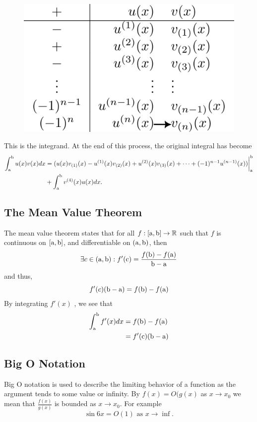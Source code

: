     \begin{figure}[H]
        \centering
        \includegraphics[width=0.34\linewidth]{include/tabular-integrand.png}
    \end{figure}
    This is the integrand. At the end of this process, the original integral has become 
    \begin{equation*}
        \begin{split}
            \int_\mathrm{a}^\mathrm{b} u(x)v(x) dx &= (u(x)v_{(1)}(x)-u^{(1)}(x)v_{(2)}(x)+u^{(2)}(x)v_{(3)}(x) + \cdots + (-1)^{n-1} u^{(n-1)}(x))\biggr\rvert_\mathrm{a}^\mathrm{b}\\ &+ \int_\mathrm{a}^\mathrm{b} v^{(4)}(x)u(x) dx.
        \end{split}
    \end{equation*}
\subsection{The Mean Value Theorem}
    The mean value theorem states that for all \(f:[\mathrm{a},\mathrm{b}]\to \mathbb{R}\) such that \(f\) is continuous on \([\mathrm{a},\mathrm{b}]\), and differentiable on \((\mathrm{a}, \mathrm{b})\), then 
    \begin{equation*}
        \exists c \in (\mathrm{a}, \mathrm{b}) : f'(\text{c}) = \frac{f(\mathrm{b})-f(\mathrm{a})}{\mathrm{b}-\mathrm{a}}
    \end{equation*}
    and thus,
    \begin{equation*}
        f'(c)(\mathrm{b}-\mathrm{a}) = f(\mathrm{b})-f(\mathrm{a})
    \end{equation*}
    By integrating \(f'(x)\) , we see that
    \begin{equation*}
        \begin{split}
            \int_{\mathrm{a}}^{\mathrm{b}} f'(x) dx &= f(\mathrm{b})-f(\mathrm{a})\\
            &=f'(\text{c})(\mathrm{b}-\mathrm{a})
        \end{split}
    \end{equation*}
\subsection{Big O Notation}
Big O notation is used to describe the limiting behavior of a function as the argument tends to some value or infinity. By \(f(x)=O(g(x)\) as \(x\to x_0\) we mean that \(\frac{f(x)}{g(x)}\) is bounded as \(x\to x_0\). For example 
\begin{equation*}
    \sin 6x = O(1) \text{ as } x\to \inf.
\end{equation*}

